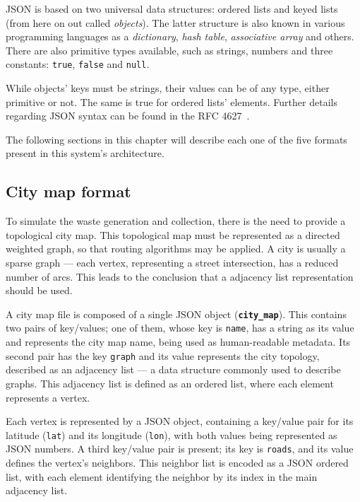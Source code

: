 JSON is based on two universal data structures: ordered lists and keyed lists
(from here on out called \textit{objects}). The latter structure is also known
in various programming languages as a \textit{dictionary}, \textit{hash table},
\textit{associative array} and others. There are also primitive types
available, such as strings, numbers and three constants: \texttt{true},
\texttt{false} and \texttt{null}.

While objects' keys must be strings, their values can be of any type, either
primitive or not. The same is true for ordered lists' elements. Further details
regarding JSON syntax can be found in the RFC 4627~\citep{site:rfc-json}.

The following sections in this chapter will describe each one of the five
formats present in this system's architecture.






\subsection{City map format}
\label{section:map-format}

To simulate the waste generation and collection, there is the need to provide a
topological city map. This topological map must be represented as a directed
weighted graph, so that routing algorithms may be applied. A city is usually a
sparse graph --- each vertex, representing a street intersection, has a reduced
number of arcs. This leads to the conclusion that a adjacency list
representation should be used.

A city map file is composed of a single JSON object
(\textbf{\texttt{city\_map}}). This contains two pairs of key/values; one of
them, whose key is \texttt{name}, has a string as its value and represents the
city map name, being used as human-readable metadata. Its second pair has the
key \texttt{graph} and its value represents the city topology, described as an
adjacency list --- a data structure commonly used to describe graphs.  This
adjacency list is defined as an ordered list, where each element represents a
vertex.

Each vertex is represented by a JSON object, containing a key/value pair for
its latitude (\texttt{lat}) and its longitude (\texttt{lon}), with both values
being represented as JSON numbers. A third key/value pair is present; its key
is \texttt{roads}, and its value defines the vertex's neighbors. This neighbor
list is encoded as a JSON ordered list, with each element identifying the
neighbor by its index in the main adjacency list.

